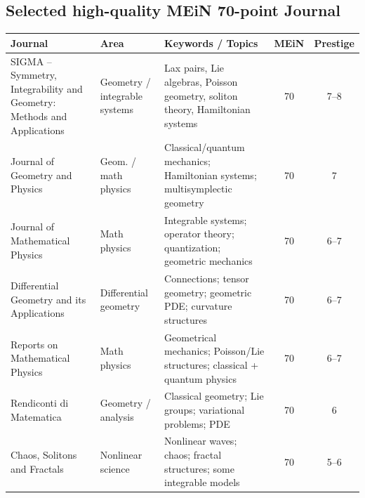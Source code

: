 \documentclass[11pt]{article}
\begin{document}
\subsection*{Selected high-quality MEiN 70-point Journal}

\begin{longtable}{p{4.6cm} p{3.6cm} p{4.8cm} c c}
\toprule
\textbf{Journal} & \textbf{Area} & \textbf{Keywords / Topics} & \textbf{MEiN} & \textbf{Prestige} \\
\midrule
SIGMA -- Symmetry, Integrability and Geometry: Methods and Applications &
Geometry / integrable systems &
Lax pairs, Lie algebras, Poisson geometry, soliton theory, Hamiltonian systems &
70 & 7--8 \\
Journal of Geometry and Physics &
Geom. / math physics &
Classical/quantum mechanics; Hamiltonian systems; multisymplectic geometry &
70 & 7 \\
Journal of Mathematical Physics &
Math physics &
Integrable systems; operator theory; quantization; geometric mechanics &
70 & 6--7 \\
Differential Geometry and its Applications &
Differential geometry &
Connections; tensor geometry; geometric PDE; curvature structures &
70 & 6--7 \\
Reports on Mathematical Physics &
Math physics &
Geometrical mechanics; Poisson/Lie structures; classical + quantum physics &
70 & 6--7 \\
Rendiconti di Matematica &
Geometry / analysis &
Classical geometry; Lie groups; variational problems; PDE &
70 & 6 \\
Chaos, Solitons and Fractals &
Nonlinear science &
Nonlinear waves; chaos; fractal structures; some integrable models &
70 & 5--6 \\
\bottomrule
\end{longtable}

\end{document}
